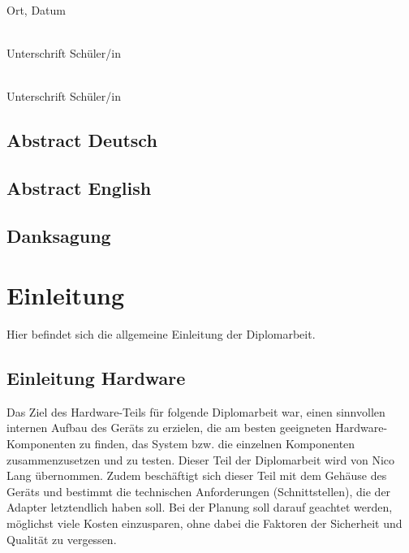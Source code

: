 \documentclass[]{article}
\begin{document}
\noindent
\begin{minipage}[c]{5cm}
	\centering \dotfill \\
	Ort, Datum
\end{minipage}
\hfill
    \begin{minipage}[c]{5cm}
        \centering \dotfill \\
        Unterschrift Schüler/in
    \end{minipage}
    
\vspace{10mm}

\noindent
\begin{flushright}
    \begin{minipage}[c]{5cm}
        \centering \dotfill \\
        Unterschrift Schüler/in
    \end{minipage}
\end{flushright}

\pagebreak

\subsection{Abstract Deutsch}
\subsection{Abstract English}
\subsection{Danksagung}

\tableofcontents

\section{Einleitung}
Hier befindet sich die allgemeine Einleitung der Diplomarbeit.

\subsection{Einleitung Hardware}
Das Ziel des Hardware-Teils für folgende Diplomarbeit war, einen sinnvollen internen Aufbau des Geräts zu erzielen, die am besten geeigneten Hardware-Komponenten zu finden, das System bzw. die einzelnen Komponenten zusammenzusetzen und zu testen. Dieser Teil der Diplomarbeit wird von Nico Lang übernommen.
Zudem beschäftigt sich dieser Teil mit dem Gehäuse des Geräts und bestimmt die technischen Anforderungen (Schnittstellen), die der Adapter letztendlich haben soll. 
Bei der Planung soll darauf geachtet werden, möglichst viele Kosten einzusparen, ohne dabei die Faktoren der Sicherheit und Qualität zu vergessen.
\end{document}

